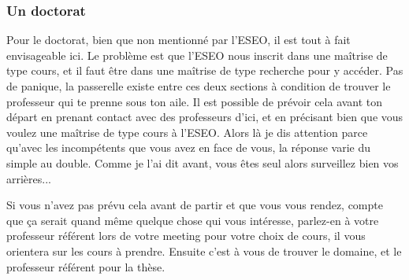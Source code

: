 \subsubsection{Un doctorat}\label{sec:sec4.7.2.1}
Pour le doctorat, bien que non mentionné par l’ESEO, il est tout à fait envisageable ici. Le problème est que l’ESEO nous inscrit dans une maîtrise de type cours, et il faut être dans une maîtrise de type recherche pour y accéder.
Pas de panique, la passerelle existe entre ces deux sections à condition de trouver le professeur qui te prenne sous ton aile.
Il est possible de prévoir cela avant ton départ en prenant contact avec des professeurs d’ici, et en précisant bien que vous voulez une maîtrise de type cours à l’ESEO. Alors là je dis attention parce qu’avec les incompétents que vous avez en face de vous, la réponse varie du simple au double. Comme je l’ai dit avant, vous êtes seul alors surveillez bien vos arrières...

Si vous n’avez pas prévu cela avant de partir et que vous vous rendez, compte que ça serait quand même quelque chose qui vous intéresse, parlez-en à votre professeur référent lors de votre meeting pour votre choix de cours, il vous orientera sur les cours à prendre. Ensuite c’est à vous de trouver le domaine, et le professeur référent pour la thèse.

